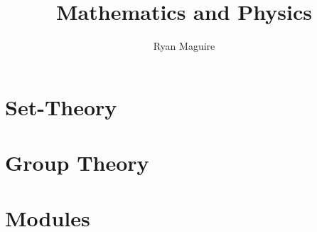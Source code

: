 \documentclass[oneside]{book}                                                  %
\title{Mathematics and Physics}                                                %
\author{Ryan Maguire}                                                          %
\date{\vspace{-5ex}}                                                           %
\newcommand*{\TOPPATH}{books}
\newcommand*{\PATH}{\TOPPATH}
\begin{document}
    \maketitle
    \tableofcontents
    \listoffigures
    \listoftables
    \clearpage
        \part{Set-Theory}
            \renewcommand{\PATH}{\TOPPATH/Foundations/%
                                 Zermelo_Fraenkel_Set_Theory}
            

        \renewcommand{\PATH}{\TOPPATH/Algebra}
        \part{Group Theory}
            \renewcommand{\PATH}{\TOPPATH/Algebra/Group_Theory}
            
        \part{Modules}
            \renewcommand{\PATH}{\TOPPATH/Algebra/Modules}
            

    
\end{document}
